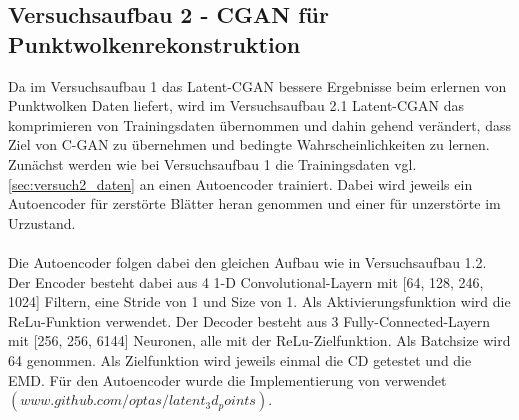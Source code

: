\documentclass{llncs}
\begin{document}
\subsection{Versuchsaufbau 2 - CGAN für Punktwolkenrekonstruktion }\label{sec:versuch2-aufbau}

Da im Versuchsaufbau 1 das Latent-CGAN bessere Ergebnisse beim erlernen von Punktwolken Daten liefert, wird im Versuchsaufbau 2.1 Latent-CGAN das komprimieren von Trainingsdaten übernommen und dahin gehend verändert, dass Ziel von C-GAN zu übernehmen und bedingte Wahrscheinlichkeiten zu lernen. Zunächst werden wie bei Versuchsaufbau 1 die Trainingsdaten vgl.\ref{sec:versuch2_daten} an einen Autoencoder trainiert. Dabei wird jeweils ein Autoencoder für zerstörte Blätter heran genommen und einer für unzerstörte im Urzustand.
\\\\
Die Autoencoder folgen dabei den gleichen Aufbau wie in Versuchsaufbau 1.2. Der Encoder besteht dabei aus 4 1-D Convolutional-Layern mit [64, 128, 246, 1024] Filtern, eine Stride von 1 und Size von 1. Als Aktivierungsfunktion wird die ReLu-Funktion verwendet. Der Decoder besteht aus 3 Fully-Connected-Layern mit [256, 256, 6144] Neuronen, alle mit der ReLu-Zielfunktion. Als Batchsize wird 64 genommen. Als Zielfunktion wird jeweils einmal die CD getestet und die EMD. Für den Autoencoder wurde die Implementierung von \cite{3dgan} verwendet$(www.github.com/optas/latent_3d_points)$. 
\\\\
\end{document}
